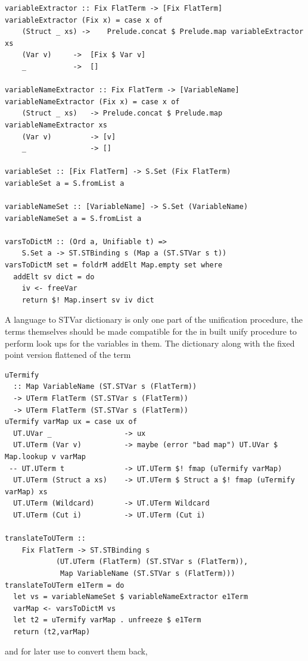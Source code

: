 \documentclass[thesis-solanki.tex]{subfiles}
\begin{document}
\begin{verbatim}
variableExtractor :: Fix FlatTerm -> [Fix FlatTerm]
variableExtractor (Fix x) = case x of
	(Struct _ xs) ->	Prelude.concat $ Prelude.map variableExtractor xs
	(Var v)		->	[Fix $ Var v]
	_			->	[] 

variableNameExtractor :: Fix FlatTerm -> [VariableName]
variableNameExtractor (Fix x) = case x of
	(Struct _ xs)	-> Prelude.concat $ Prelude.map variableNameExtractor xs
	(Var v)			-> [v]
	_ 				-> []	

variableSet :: [Fix FlatTerm] -> S.Set (Fix FlatTerm)
variableSet a = S.fromList a

variableNameSet :: [VariableName] -> S.Set (VariableName)
variableNameSet a = S.fromList a

varsToDictM :: (Ord a, Unifiable t) =>
    S.Set a -> ST.STBinding s (Map a (ST.STVar s t))
varsToDictM set = foldrM addElt Map.empty set where
  addElt sv dict = do
    iv <- freeVar
    return $! Map.insert sv iv dict
\end{verbatim}

A language to STVar dictionary is only one part of the unification procedure, the terms themselves should be made compatible for the in 
built unify procedure to perform look ups for the variables in them. The dictionary along with the fixed point version flattened of the term


\begin{verbatim}
uTermify 
  :: Map VariableName (ST.STVar s (FlatTerm)) 
  -> UTerm FlatTerm (ST.STVar s (FlatTerm)) 
  -> UTerm FlatTerm (ST.STVar s (FlatTerm))
uTermify varMap ux = case ux of
  UT.UVar _          		-> ux
  UT.UTerm (Var v)  		-> maybe (error "bad map") UT.UVar $ Map.lookup v varMap
 -- UT.UTerm t         		-> UT.UTerm $! fmap (uTermify varMap) 
  UT.UTerm (Struct a xs)	-> UT.UTerm $ Struct a $! fmap (uTermify varMap) xs  	
  UT.UTerm (Wildcard)		-> UT.UTerm Wildcard
  UT.UTerm (Cut i)			-> UT.UTerm (Cut i)

translateToUTerm ::
    Fix FlatTerm -> ST.STBinding s
            (UT.UTerm (FlatTerm) (ST.STVar s (FlatTerm)),
             Map VariableName (ST.STVar s (FlatTerm)))
translateToUTerm e1Term = do
  let vs = variableNameSet $ variableNameExtractor e1Term
  varMap <- varsToDictM vs
  let t2 = uTermify varMap . unfreeze $ e1Term
  return (t2,varMap)
\end{verbatim}

and for later use to convert them back,
\end{document}
